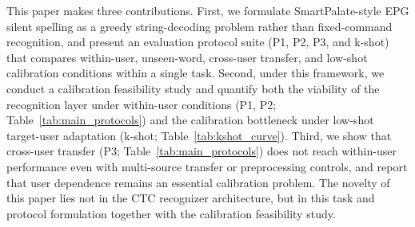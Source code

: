 This paper makes three contributions.
First, we formulate SmartPalate-style EPG silent spelling as a greedy string-decoding problem rather than fixed-command recognition, and present an evaluation protocol suite (P1, P2, P3, and k-shot) that compares within-user, unseen-word, cross-user transfer, and low-shot calibration conditions within a single task.
Second, under this framework, we conduct a calibration feasibility study and quantify both the viability of the recognition layer under within-user conditions (P1, P2; Table~\ref{tab:main_protocols}) and the calibration bottleneck under low-shot target-user adaptation (k-shot; Table~\ref{tab:kshot_curve}).
Third, we show that cross-user transfer (P3; Table~\ref{tab:main_protocols}) does not reach within-user performance even with multi-source transfer or preprocessing controls, and report that user dependence remains an essential calibration problem.
The novelty of this paper lies not in the CTC recognizer architecture, but in this task and protocol formulation together with the calibration feasibility study.
